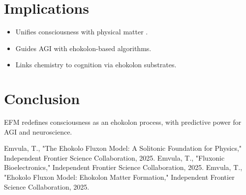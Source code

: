 \documentclass{article}
\begin{document}
\section{Implications}
\begin{itemize}
    \item Unifies consciousness with physical matter \cite{emvula2025matter}.
    \item Guides AGI with ehokolon-based algorithms.
    \item Links chemistry to cognition via ehokolon substrates.
\end{itemize}

\section{Conclusion}
EFM redefines consciousness as an ehokolon process, with predictive power for AGI and neuroscience.

\begin{thebibliography}{3}
 Emvula, T., "The Ehokolo Fluxon Model: A Solitonic Foundation for Physics," Independent Frontier Science Collaboration, 2025.
 Emvula, T., "Fluxonic Bioelectronics," Independent Frontier Science Collaboration, 2025.
 Emvula, T., "Ehokolo Fluxon Model: Ehokolon Matter Formation," Independent Frontier Science Collaboration, 2025.
\end{thebibliography}
\end{document}
